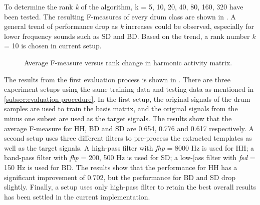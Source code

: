 \documentclass{article}
\begin{document}
To determine the rank {\itshape k} of the algorithm, k = {5, 10, 20, 40, 80, 160, 320} have been tested. The resulting F-measures of every drum class are shown in . A general trend of performance drop as {\itshape k} increases could be observed, especially for lower frequency sounds such as SD and BD. Based on the trend, a rank number {\itshape k} = 10 is chosen in current setup. 

\begin{figure}
 \centerline{}
 \caption{Average F-measure versus rank change in harmonic activity matrix.}
 \label{fig:rankTest}
\end{figure}

The results from the first evaluation process is shown in . There are three experiment setups using the same training data and testing data as mentioned in \ref{subsec:evaluation procedure}. In the first setup, the original signals of the drum samples are used to train the basis matrix, and the original signals from the minus one subset are used as the target signals. The results show that the average F-measure for HH, BD and SD are 0.654, 0.776 and 0.617 respectively. A second setup uses three different filters to pre-process the extracted templates as well as the target signals. A high-pass filter with {\itshape f\tiny hp} = 8000 Hz is used for HH; a band-pass filter with {\itshape f\tiny bp} = {200, 500} Hz is used for SD; a low-[ass filter with {\itshape f\tiny sd} = 150 Hz is used for BD. The results show that the performance for HH has a significant improvement of 0.702, but the performance for BD and SD drop slightly. Finally, a setup uses only high-pass filter to retain the best overall results has been settled in the current implementation. 
\end{document}
